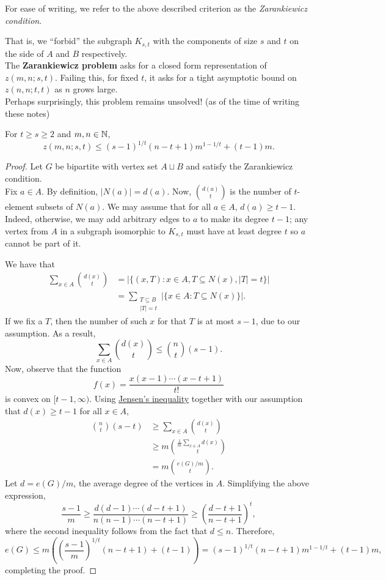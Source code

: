 \documentclass{article}
\begin{document}
		For ease of writing, we refer to the above described criterion as the \emph{Zarankiewicz condition}.

		That is, we ``forbid'' the subgraph $K_{s,t}$ with the components of size $s$ and $t$ on the side of $A$ and $B$ respectively.\\

		The \textbf{Zarankiewicz problem} asks for a closed form representation of $z(m,n;s,t)$. Failing this, for fixed $t$, it asks for a tight asymptotic bound on $z(n,n;t,t)$ as $n$ grows large.\\
		Perhaps surprisingly, this problem remains unsolved! (as of the time of writing these notes)

		\begin{ftheo}
			For $t\ge s\ge 2$ and $m,n\in\mathbb{N}$,
			$$z(m,n;s,t) \le (s-1)^{1/t} (n-t+1)m^{1-1/t} + (t-1)m.$$
		\end{ftheo}
		\begin{proof}
			Let $G$ be bipartite with vertex set $A \sqcup B$ and satisfy the Zarankiewicz condition.\\
			Fix $a \in A$. By definition, $|N(a)| = d(a)$. Now, $\binom{d(a)}{t}$ is the number of $t$-element subsets of $N(a)$. We may assume that for all $a \in A$, $d(a) \ge t-1$. Indeed, otherwise, we may add arbitrary edges to $a$ to make its degree $t-1$; any vertex from $A$ in a subgraph isomorphic to $K_{s,t}$ must have at least degree $t$ so $a$ cannot be part of it.

			We have that
			\begin{align*}
				\sum_{x \in A} \binom{d(x)}{t} &= \left| \{ (x,T) : x \in A, T \subseteq N(x), |T|=t \} \right| \\
				&= \sum_{\substack{T \subseteq B \\ |T| = t}} |\{x \in A : T \subseteq N(x)\}|.
			\end{align*}
			If we fix a $T$, then the number of such $x$ for that $T$ is at most $s-1$, due to our assumption. As a result,
			\[ \sum_{x \in A} \binom{d(x)}{t} \le \binom{n}{t} (s-1). \]
			Now, observe that the function
			\[ f(x) = \frac{x(x-1)\cdots(x-t+1)}{t!} \]
			is convex on $[t-1,\infty)$.
			Using \href{https://en.wikipedia.org/wiki/Jensen%27s_inequality#Finite_form}{Jensen's inequality} together with our assumption that $d(x) \ge t-1$ for all $x\in A$,
			\begin{align*}
				\binom{n}{t} (s-t) &\ge \sum_{x\in A} \binom{d(x)}{t} \\
				 &\ge m \binom{\frac{1}{m}\sum_{x\in A} d(x)}{t} \\
				 &= m \binom{e(G)/m}{t}.
			\end{align*}
			Let $d = e(G)/m$, the average degree of the vertices in $A$. Simplifying the above expression,
			\[ \frac{s-1}{m} \ge \frac{d(d-1)\cdots (d-t+1)}{n(n-1)\cdots(n-t+1)} \ge \left(\frac{d-t+1}{n-t+1}\right)^t, \]
			where the second inequality follows from the fact that $d \le n$. Therefore,
			\[ e(G) \le m \left( \left(\frac{s-1}{m}\right)^{1/t} (n-t+1) + (t-1) \right) = (s-1)^{1/t} (n-t+1) m^{1 - 1/t} + (t-1)m, \]
			completing the proof.
		\end{proof}
\end{document}
